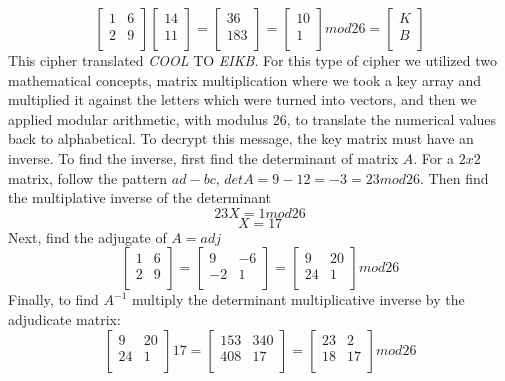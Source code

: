 \documentclass[12pt,letterpaper]{article} %
\begin{document}
\[\begin{bmatrix}
1&6\\
2&9\\
\end{bmatrix}
\begin{bmatrix}
14\\
11\\
\end{bmatrix}
=
\begin{bmatrix}
36\\
183\\
\end{bmatrix}
=
\begin{bmatrix}
10\\
1\\
\end{bmatrix}
mod26
=
\begin{bmatrix}
K\\
B\\
\end{bmatrix}\]
This cipher translated \emph{COOL} TO \emph{EIKB}. For this type of cipher we utilized two mathematical concepts, matrix multiplication where we took a key array and multiplied it against the letters which were turned into vectors, and then we applied modular arithmetic, with modulus 26, to translate the numerical values back to alphabetical.  To decrypt this message, the key matrix must have an inverse.  To find the inverse, first find the determinant of matrix $A$.  For a $2x2$ matrix, follow the pattern $ad-bc$, $detA = 9 - 12 = -3 = 23mod26$.  Then find the multiplative inverse of the determinant \[23X = 1mod26\]\[ X= 17\] 
Next, find the adjugate of
\newline $ A = adj$
\[\begin{bmatrix}
1&6\\
2&9\\
\end{bmatrix} 
=
\begin{bmatrix}
9&-6\\
-2&1\\
\end{bmatrix}
=
\begin{bmatrix}
9&20\\
24&1\\
\end{bmatrix}mod26\]
Finally, to find $A^{-1}$ multiply the determinant multiplicative inverse by the adjudicate matrix:
\[\begin{bmatrix}
9&20\\
24&1\\
\end{bmatrix}17
=
\begin{bmatrix}
153&340\\
408&17\\
\end{bmatrix}
=
\begin{bmatrix}
23&2\\
18&17\\
\end{bmatrix}mod26\]
\end{document}
